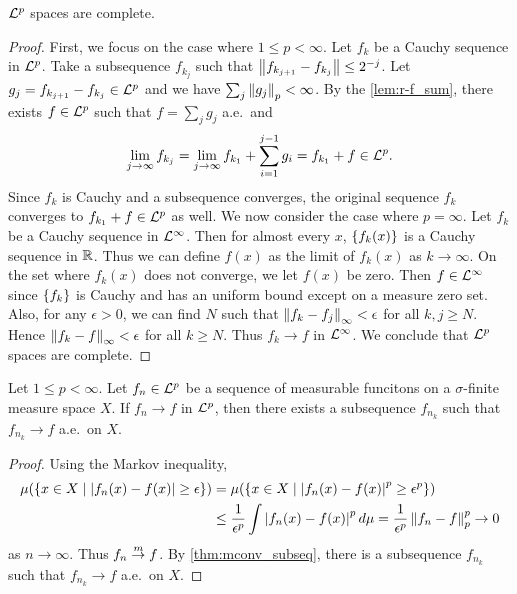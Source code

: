 \begin{theorem}
    $\mathcal{L}^p$ spaces are complete. 
\end{theorem}
\begin{proof}
    First, we focus on the case where $1\leq p<\infty$. Let $f_k$ be a 
    Cauchy sequence in $\mathcal{L}^p$. Take a subsequence $f_{k_j}$ such that 
    $\left\lVert {f_{k_{j+1}}-f_{k_j}} \right\rVert \leq 2^{-j}$. Let 
    $g_j = f_{k_{j+1}}-f_{k_j}\in\mathcal{L}^p$ and we have 
    $\sum_j \left\lVert {g_j} \right\rVert_p < \infty$. By the \cref{lem:r-f_sum}, there exists 
    $f\in\mathcal{L}^p$ such that $f = \sum_j g_j$ a.e.\ and 
    \begin{equation*}
        \lim_{j\to\infty} f_{k_j} = \lim_{j\to\infty} f_{k_1} + \sum_{i=1}^{j-1} g_i 
        = f_{k_1} + f\in\mathcal{L}^p.
    \end{equation*}
    Since $f_k$ is Cauchy and a subsequence converges, the original 
    sequence $f_k$ converges to $f_{k_1} + f\in\mathcal{L}^p$ as well. 
    We now consider the case where $p=\infty$. Let $f_k$ be a Cauchy 
    sequence in $\mathcal{L}^\infty$. Then for almost every $x$, $\left\{ {f_k(x)} \right\}$ 
    is a Cauchy sequence in $\mathbb{R}$. Thus we can define $f(x)$ as the 
    limit of $f_k(x)$ as $k\to\infty$. On the set where $f_k(x)$ does 
    not converge, we let $f(x)$ be zero. Then $f\in\mathcal{L}^\infty$ since 
    $\left\{ {f_k} \right\}$ is Cauchy and has an uniform bound except on a measure 
    zero set. Also, for any $\epsilon>0$, we can find $N$ such that 
    $\left\lVert {f_k - f_j} \right\rVert_\infty < \epsilon$ for all $k,j\geq N$. Hence 
    $\left\lVert {f_k-f} \right\rVert_\infty < \epsilon$ for all $k\geq N$. Thus $f_k\to f$ 
    in $\mathcal{L}^\infty$. We conclude that $\mathcal{L}^p$ spaces are complete.
\end{proof}

\begin{theorem}\label{thm:Lp_subseq_ae}
    Let $1\leq p<\infty$. Let $f_n\in\mathcal{L}^p$ be a sequence of measurable 
    funcitons on a $\sigma$-finite measure space $X$. If $f_n\to f$ in $\mathcal{L}^p$, 
    then there exists a subsequence $f_{n_k}$ such that $f_{n_k}\to f$ a.e.\ on $X$.
\end{theorem}
\begin{proof}
    Using the Markov inequality, 
    \begin{equation*}
        \begin{split}
            \mu\pth{\Set{x\in X}{\abs{f_n(x)-f(x)}\geq \epsilon}} 
            &= \mu\pth{\Set{x\in X}{\abs{f_n(x)-f(x)}^p\geq \epsilon^p}} \\
            &\leq \frac{1}{\epsilon^p}\int \abs{f_n(x)-f(x)}^pd\mu 
            = \frac{1}{\epsilon^p}\norm{f_n-f}_p^p \to 0
        \end{split}
    \end{equation*}
    as $n\to\infty$. Thus $f_n\overset{m}{\to} f$. By \cref{thm:mconv_subseq}, there 
    is a subsequence $f_{n_k}$ such that $f_{n_k}\to f$ a.e.\ on $X$.
\end{proof}

